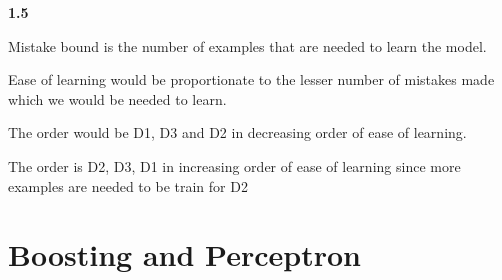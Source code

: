 \documentclass[11pt]{article}
\begin{document}
\begin{itemize}
\textbf{1.5}

Mistake bound is the number of examples that are needed to learn the model. 

Ease of learning would be proportionate to the lesser number of mistakes made which we would be needed  to learn.

The order would be D1, D3 and D2 in decreasing order of ease of learning.

The order is D2, D3, D1 in increasing order of ease of learning since more examples are needed to be train for D2\\

\end{itemize}

\pagebreak

\section{Boosting and Perceptron}
\end{document}
